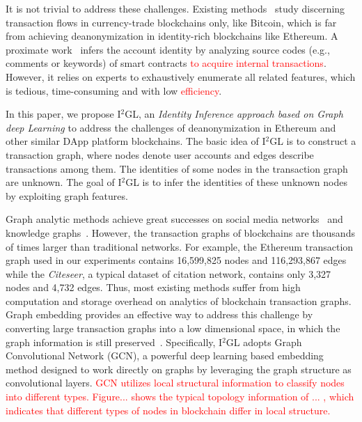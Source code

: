 It is not trivial to address these challenges. Existing methods~\cite{maesa2016analysis,ranshous2017exchange,zhao2015graph} study discerning transaction flows in currency-trade blockchains only, like Bitcoin, which is far from achieving deanonymization in identity-rich blockchains like Ethereum. A proximate work~\cite{chen2018infocom} infers the account identity by analyzing source codes (e.g., comments or keywords) of smart contracts \textcolor{red}{to acquire internal transactions}. However, it relies on experts to exhaustively enumerate all related features, which is tedious, time-consuming and with low \textcolor{red}{efficiency}.


In this paper, we propose I$^2$GL, an \textit{Identity Inference approach based on Graph deep Learning} to address the challenges of deanonymization in Ethereum and other similar DApp platform blockchains. The basic idea of I$^2$GL is to construct a transaction graph, where nodes denote user accounts and edges describe transactions among them. The identities of some nodes in the transaction graph are unknown. The goal of I$^2$GL is to infer the identities of these unknown nodes by exploiting graph features.

Graph analytic methods achieve great successes on social media networks~\cite{geng2015learning} and knowledge graphs~\cite{bollacker2008freebase}. However, the transaction graphs of blockchains are thousands of times larger than traditional networks. For example, the Ethereum transaction graph used in our experiments contains 16,599,825 nodes and 116,293,867 edges while the \emph{Citeseer}, a typical dataset of citation network, contains only 3,327 nodes and 4,732 edges. Thus, most existing methods suffer from high computation and storage overhead on analytics of blockchain transaction graphs. Graph embedding provides an effective way to address this challenge by converting large transaction graphs into a low dimensional space, in which the graph information is still preserved~\cite{hamilton2017representation}.
Specifically, I$^2$GL adopts Graph Convolutional Network (GCN), a powerful deep learning based embedding method designed to work directly on graphs by leveraging the graph structure as convolutional layers. \textcolor{red}{GCN utilizes local structural information to classify nodes into different types. Figure... shows the typical topology information of ... , which indicates that different types of nodes in blockchain differ in local structure.}

